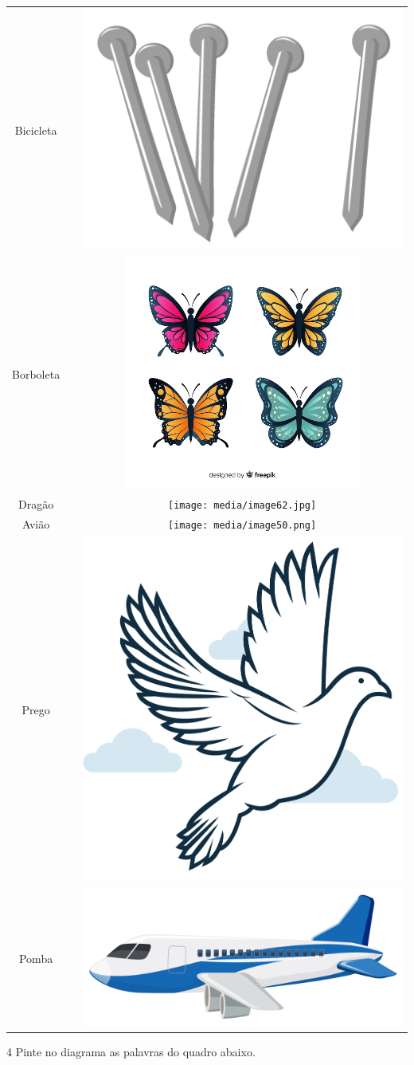 \begin{table}[H]
\centering
\begin{tabular}{cp{7cm}c}
Bicicleta & & \includegraphics[width=.3\textwidth]{media/image59.png} \\
Borboleta & & \includegraphics[width=.3\textwidth]{media/image61.png} \\
Dragão & & \texttt{[image: media/image62.jpg]} \\
Avião & & \texttt{[image: media/image50.png]} \\
Prego & & \includegraphics[width=.23\textwidth]{media/image66.png} \\
Pomba & & \includegraphics[width=.4\textwidth]{media/image65.jpg}
\end{tabular}
\end{table}

\num{4} Pinte no diagrama as palavras do quadro abaixo.

\vspace*{+2em}


